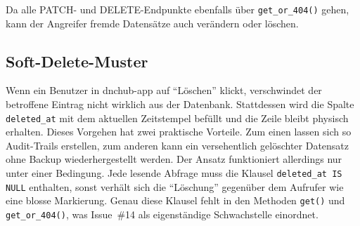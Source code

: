 Da alle PATCH- und DELETE-Endpunkte ebenfalls über \texttt{get\_or\_404()}
gehen, kann der Angreifer fremde Datensätze auch verändern oder löschen.

\subsection{Soft-Delete-Muster}

Wenn ein Benutzer in dnchub-app auf \enquote{Löschen} klickt, verschwindet
der betroffene Eintrag nicht wirklich aus der Datenbank. Stattdessen wird
die Spalte \texttt{deleted\_at} mit dem aktuellen Zeitstempel befüllt und
die Zeile bleibt physisch erhalten. Dieses Vorgehen hat zwei praktische
Vorteile. Zum einen lassen sich so Audit-Trails erstellen, zum anderen
kann ein versehentlich gelöschter Datensatz ohne Backup wiederhergestellt
werden. Der Ansatz funktioniert allerdings nur unter einer Bedingung. Jede
lesende Abfrage muss die Klausel \texttt{deleted\_at IS NULL} enthalten,
sonst verhält sich die \enquote{Löschung} gegenüber dem Aufrufer wie eine
blosse Markierung. Genau diese Klausel fehlt in den Methoden
\texttt{get()} und \texttt{get\_or\_404()}, was Issue~\#14
\parencite{github_issue_14} als eigenständige Schwachstelle einordnet.